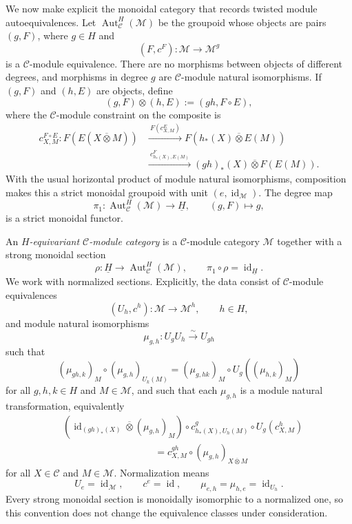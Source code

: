 \documentclass[12pt]{amsart}
\theoremstyle{plain}
\theoremstyle{definition} %
\theoremstyle{remark} %
\newcommand{\cC}{\mathcal{C}}
\newcommand{\cM}{\mathcal{M}}
\newcommand{\Aut}{\operatorname{Aut}}
\newcommand{\id}{\operatorname{id}}
\begin{document}
We now make explicit the monoidal category that records twisted module autoequivalences. Let $\Aut_{\cC}^{H}(\cM)$ be the groupoid whose objects are pairs $(g,F)$, where $g\in H$ and
\[
(F,c^F):\cM\longrightarrow\cM^g
\]
is a $\cC$-module equivalence. There are no morphisms between objects of different degrees, and morphisms in degree $g$ are $\cC$-module natural isomorphisms. If $(g,F)$ and $(h,E)$ are objects, define
\[
(g,F)\otimes(h,E):=(gh,F\circ E),
\]
where the $\cC$-module constraint on the composite is
\begin{equation}\label{eq:twisted_composite_constraint}
\begin{aligned}
c^{F\circ E}_{X,M}:F(E(X\overline\otimes M))
&\xrightarrow{\ F(c^E_{X,M})\ }
F(h_*(X)\overline\otimes E(M))\\
&\xrightarrow{\ c^F_{h_*(X),E(M)}\ }
(gh)_*(X)\overline\otimes F(E(M)).
\end{aligned}
\end{equation}
With the usual horizontal product of module natural isomorphisms, composition makes this a strict monoidal groupoid with unit $(e,\id_{\cM})$. The degree map
\[
\pi_1:\Aut_{\cC}^{H}(\cM)\longrightarrow\underline H,
\qquad
(g,F)\longmapsto g,
\]
is a strict monoidal functor.

An \emph{$H$-equivariant $\cC$-module category} is a $\cC$-module category $\cM$ together with a strong monoidal section
\[
\rho:\underline H\longrightarrow\Aut_{\cC}^{H}(\cM),
\qquad
\pi_1\circ\rho=\id_{\underline H}.
\]
We work with normalized sections. Explicitly, the data consist of $\cC$-module equivalences
\[
(U_h,c^h):\cM\longrightarrow\cM^h,
\qquad h\in H,
\]
and module natural isomorphisms
\[
\mu_{g,h}:U_gU_h\xrightarrow{\sim}U_{gh}
\]
such that
\begin{equation}\label{eq:equivariant_module_pentagon}
(\mu_{gh,k})_M\circ(\mu_{g,h})_{U_k(M)}
=(\mu_{g,hk})_M\circ U_g((\mu_{h,k})_M)
\end{equation}
for all $g,h,k\in H$ and $M\in\cM$, and such that each $\mu_{g,h}$ is a module natural transformation, equivalently
\begin{equation}\label{eq:equivariant_module_compatibility}
\begin{aligned}
&(\id_{(gh)_*(X)}\overline\otimes(\mu_{g,h})_M)
\circ c^g_{h_*(X),U_h(M)}\circ U_g(c^h_{X,M})\\
&\hspace{4cm}=
 c^{gh}_{X,M}\circ(\mu_{g,h})_{X\overline\otimes M}
\end{aligned}
\end{equation}
for all $X\in\cC$ and $M\in\cM$. Normalization means
\begin{equation}\label{eq:equivariant_module_normalization}
U_e=\id_{\cM},\qquad c^e=\id,
\qquad \mu_{e,h}=\mu_{h,e}=\id_{U_h}.
\end{equation}
Every strong monoidal section is monoidally isomorphic to a normalized one, so this convention does not change the equivalence classes under consideration.
\end{document}
